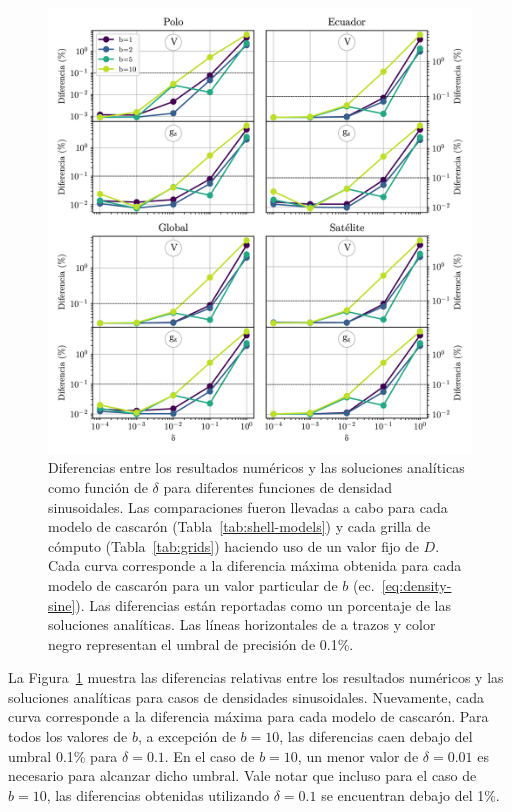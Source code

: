 \begin{figure}
\centering
\includegraphics[width=\linewidth]{figs/tesseroids-variable-density/sine-density-diffs.png}
\caption{
    Diferencias entre los resultados numéricos y las soluciones analíticas como
    función de $\delta$ para diferentes funciones de densidad sinusoidales.
    Las comparaciones fueron llevadas a cabo para cada modelo de cascarón
    (Tabla~\ref{tab:shell-models}) y cada grilla de cómputo
    (Tabla~\ref{tab:grids}) haciendo uso de un valor fijo de $D$.
    Cada curva corresponde a la diferencia máxima obtenida para cada modelo de
    cascarón para un valor particular de $b$ (ec.~\ref{eq:density-sine}).
    Las diferencias están reportadas como un porcentaje de las soluciones
    analíticas. Las líneas horizontales de a trazos y color negro representan
    el umbral de precisión de 0.1\%.
    }
\label{fig:delta-sine}
\end{figure}

La Figura~\ref{fig:delta-sine}
muestra las diferencias relativas entre los resultados numéricos y las
soluciones analíticas para casos de densidades sinusoidales.
Nuevamente, cada curva corresponde a la diferencia máxima para cada modelo de
cascarón.
Para todos los valores de $b$, a excepción de $b=10$, las diferencias caen
debajo del umbral 0.1\% para $\delta = 0.1$.
En el caso de $b=10$, un menor valor de $\delta = 0.01$ es necesario para
alcanzar dicho umbral.
Vale notar que incluso para el caso de $b=10$, las diferencias obtenidas
utilizando $\delta = 0.1$ se encuentran debajo del 1\%.


